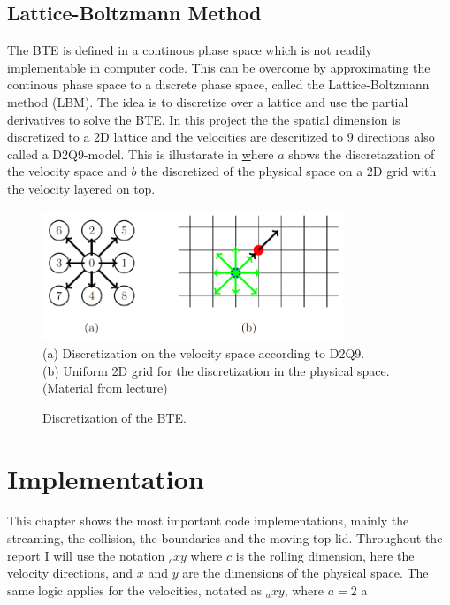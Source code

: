 \documentclass[a4paper,11pt, oneside]{book}
\begin{document}
\section{Lattice-Boltzmann Method} \label{sec:lbm}
The BTE is defined in a continous phase space which is not readily implementable in computer code.
This can be overcome by approximating the continous phase space to a discrete phase space, called the Lattice-Boltzmann method (LBM).
The idea is to discretize over a lattice and use the partial derivatives to solve the BTE.
In this project the the spatial dimension is discretized to a 2D lattice and the velocities are descritized to 9 directions also called a D2Q9-model.
This is illustarate in \href{fig:d2q9-scheme} where $a$ shows the discretazation of the velocity space and $b$ the discretized of the physical space on a 2D grid with the velocity layered on top.
\begin{figure}[h]
  \caption{Discretization of the BTE.}
  \label{fig:d2q9-scheme}
  \centering
  \includegraphics[width=9cm]{d2q9_scheme.png}\\
  (a) Discretization on the velocity space according to D2Q9.\\
  (b) Uniform 2D grid for the discretization in the physical space.\\
  \small{(Material from lecture)}
\end{figure}

\clearpage
\chapter{Implementation}
This chapter shows the most important code implementations, mainly the streaming, the collision, the boundaries and the moving top lid.
Throughout the report I will use the notation $_cxy$ where $c$ is the rolling dimension, here the velocity directions, and $x$ and $y$ are the dimensions of the physical space. The same logic applies for the velocities, notated as $_axy$, where $a=2$ a
\end{document}
